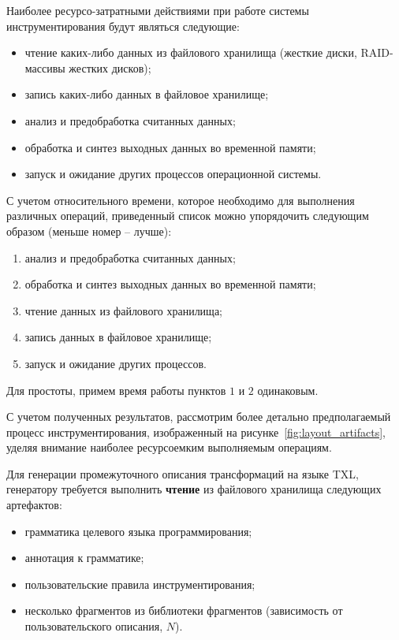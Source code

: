 Наиболее ресурсо-затратными действиями при работе системы инструментирования будут являться следующие:
\begin{itemize}[noitemsep]
  \item чтение каких-либо данных из файлового хранилища (жесткие диски, RAID-массивы жестких дисков);
  \item запись каких-либо данных в файловое хранилище;
  \item анализ и предобработка считанных данных;
  \item обработка и синтез выходных данных во временной памяти;
  \item запуск и ожидание других процессов операционной системы.
\end{itemize}

С учетом относительного времени, которое необходимо для выполнения различных операций, приведенный список можно упорядочить следующим образом (меньше номер -- лучше):
\begin{enumerate}[noitemsep]
  \item анализ и предобработка считанных данных;
  \item обработка и синтез выходных данных во временной памяти;
  \item чтение данных из файлового хранилища;
  \item запись данных в файловое хранилище;
  \item запуск и ожидание других процессов.
\end{enumerate}

Для простоты, примем время работы пунктов $1$ и $2$ одинаковым.

С учетом полученных результатов, рассмотрим более детально предполагаемый процесс инструментирования, изображенный на рисунке~\ref{fig:layout_artifacts}, уделяя внимание наиболее ресурсоемким выполняемым операциям.

Для генерации промежуточного описания трансформаций на языке TXL, генератору требуется выполнить \textbf{чтение} из файлового хранилища следующих артефактов:
\begin{itemize}[noitemsep]
  \item грамматика целевого языка программирования;
  \item аннотация к грамматике;
  \item пользовательские правила инструментирования;
  \item несколько фрагментов из библиотеки фрагментов (зависимость от пользовательского описания, $N$).
\end{itemize}

